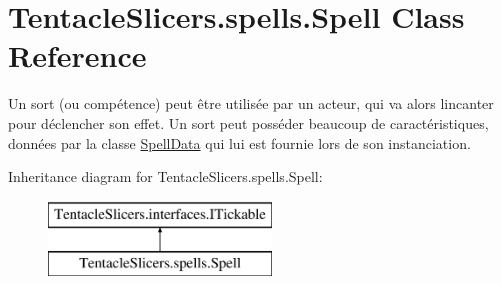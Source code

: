 \hypertarget{class_tentacle_slicers_1_1spells_1_1_spell}{}\section{Tentacle\+Slicers.\+spells.\+Spell Class Reference}
\label{class_tentacle_slicers_1_1spells_1_1_spell}


Un sort (ou compétence) peut être utilisée par un acteur, qui va alors l\textquotesingle{}incanter pour déclencher son effet. Un sort peut posséder beaucoup de caractéristiques, données par la classe \hyperlink{class_tentacle_slicers_1_1spells_1_1_spell_data}{Spell\+Data} qui lui est fournie lors de son instanciation.  


Inheritance diagram for Tentacle\+Slicers.\+spells.\+Spell\+:\begin{figure}[H]
\begin{center}
\leavevmode
\includegraphics[height=2.000000cm]{class_tentacle_slicers_1_1spells_1_1_spell}
\end{center}
\end{figure}
